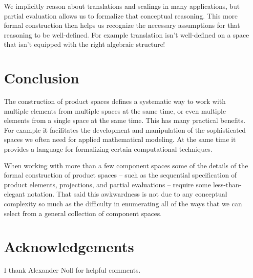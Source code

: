 \documentclass[
  letterpaper,
  DIV=11,
  numbers=noendperiod]{scrartcl}
\begin{document}
We implicitly reason about translations and scalings in many
applications, but partial evaluation allows us to formalize that
conceptual reasoning. This more formal construction then helps us
recognize the necessary assumptions for that reasoning to be
well-defined. For example translation isn't well-defined on a space that
isn't equipped with the right algebraic structure!

\hypertarget{conclusion}{%
\section{Conclusion}\label{conclusion}}

The construction of product spaces defines a systematic way to work with
multiple elements from multiple spaces at the same time, or even
multiple elements from a single space at the same time. This has many
practical benefits. For example it facilitates the development and
manipulation of the sophisticated spaces we often need for applied
mathematical modeling. At the same time it provides a language for
formalizing certain computational techniques.

When working with more than a few component spaces some of the details
of the formal construction of product spaces -- such as the sequential
specification of product elements, projections, and partial evaluations
-- require some less-than-elegant notation. That said this awkwardness
is not due to any conceptual complexity so much as the difficulty in
enumerating all of the ways that we can select from a general collection
of component spaces.

\hypertarget{acknowledgements}{%
\section*{Acknowledgements}\label{acknowledgements}}

I thank Alexander Noll for helpful comments.
\end{document}
